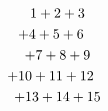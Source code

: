 \setlength{\multlinegap}{3em}
\setlength{\multlinetaggap}{3em}
\begin{multline*}
1+2+3 \\ \shoveleft{+4+5+6} \\
+7+8+9 \\
\shoveright{+10+11+12} \\ +13+14+15
\end{multline*}
